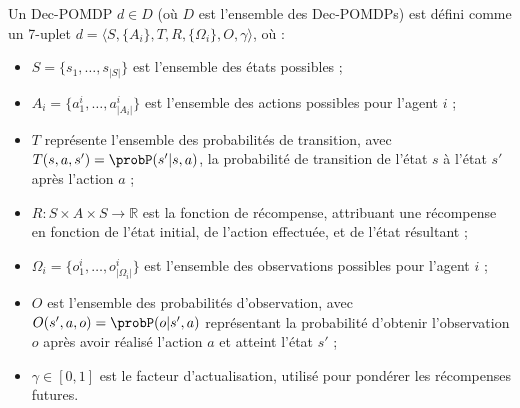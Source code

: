 Un Dec-POMDP $d \in D$ (où $D$ est l'ensemble des Dec-POMDPs) est défini comme un 7-uplet $d = \langle S, \{A_i\}, T, R, \{\Omega_i\}, O, \gamma \rangle$, où :
\begin{itemize}
    \item $S = \{s_1,\dots,s_{|S|}\}$ est l'ensemble des états possibles ;
    \item $A_{i} = \{a_{1}^{i},\dots,a_{|A_{i}|}^{i}\}$ est l'ensemble des actions possibles pour l'agent $i$ ;
    \item $T$ représente l'ensemble des probabilités de transition, avec $T(s,a,s') = \probP(s'|s,a)$, la probabilité de transition de l'état $s$ à l'état $s'$ après l'action $a$ ;
    \item $R: S \times A \times S \rightarrow \mathbb{R}$ est la fonction de récompense, attribuant une récompense en fonction de l'état initial, de l'action effectuée, et de l'état résultant ;
    \item $\Omega_{i} = \{o_{1}^{i},\dots,o_{|\Omega_{i}|}^{i}\}$ est l'ensemble des observations possibles pour l'agent $i$ ;
    \item $O$ est l'ensemble des probabilités d'observation, avec $O(s',a,o) = \probP(o|s',a)$ représentant la probabilité d'obtenir l'observation $o$ après avoir réalisé l'action $a$ et atteint l'état $s'$ ;
    \item $\gamma \in [0,1]$ est le facteur d'actualisation, utilisé pour pondérer les récompenses futures.
\end{itemize}

